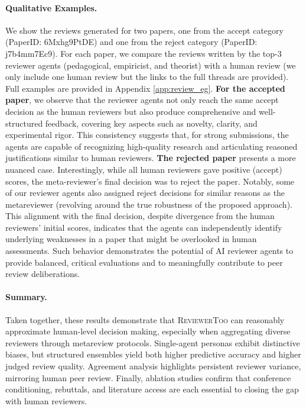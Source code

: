 \documentclass{article} %
\newcommand{\shrink}[1][0.5]{\vspace{-#1\baselineskip}}
\begin{document}
\paragraph{Qualitative Examples.}\shrink[0.75]
We show the reviews generated for two papers, one from the accept category (PaperID: 6Mxhg9PtDE) and one from the reject category (PaperID: j7b4mm7Ec9). For each paper, we compare the reviews written by the top-3 reviewer agents (pedagogical, empiricist, and theorist) with a human review (we only include one human review but the links to the full threads are provided). Full examples are provided in Appendix \ref{app:review_eg}.
\textbf{For the accepted paper}, we observe that the reviewer agents not only reach the same accept decision as the human reviewers but also produce comprehensive and well-structured feedback, covering key aspects such as novelty, clarity, and experimental rigor. This consistency suggests that, for strong submissions, the agents are capable of recognizing high-quality research and articulating reasoned justifications similar to human reviewers.
\textbf{The rejected paper} presents a more nuanced case. Interestingly, while all human reviewers gave positive (accept) scores, the meta-reviewer's final decision was to reject the paper. Notably, some of our reviewer agents also assigned reject decisions for similar reasons as the metareviewer (revolving around the true robustness of the proposed approach). This alignment with the final decision, despite divergence from the human reviewers' initial scores, indicates that the agents can independently identify underlying weaknesses in a paper that might be overlooked in human assessments. Such behavior demonstrates the potential of AI reviewer agents to provide balanced, critical evaluations and to meaningfully contribute to peer review deliberations.

\paragraph{Summary.}\shrink[0.75]
Taken together, these results demonstrate that \textsc{ReviewerToo} can reasonably approximate human-level decision making, especially when aggregating diverse reviewers through metareview protocols. Single-agent personas exhibit distinctive biases, but structured ensembles yield both higher predictive accuracy and higher judged review quality. Agreement analysis highlights persistent reviewer variance, mirroring human peer review. Finally, ablation studies confirm that conference conditioning, rebuttals, and literature access are each essential to closing the gap with human reviewers.
\end{document}
